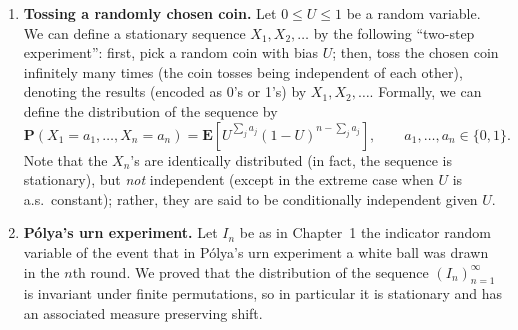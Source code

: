 \documentclass[12pt]{article}
\newcommand{\prob}{\mathbf{P}}
\newcommand{\expec}{\mathbf{E}}
\theoremstyle{example}
\begin{document}
\begin{enumerate}[1.]
$$ p_{i,j} = \prob(X_{2} = \alpha_j\,|\,X_1=\alpha_i), \qquad (1\le i,j\le d), $$
then the matrix $P = (p_{i,j})_{i,j=1}^d$ together with the probability distribution of the initial state $X_0$ determine the distribution of the entire sequence. The probability $p_{i,j}$ is referred to as the \textbf{transition probability from state $i$ to $j$}, and the matrix $P$ is called the \textbf{transition matrix} of the chain. The distribution of $X_0$ is usually given as a probability vector $\pi=(\pi_1,\ldots,\pi_d)$ where $\pi_j=\prob(X_0=j)$. It is easy to show (we will do so later, when we study Markov chains more in depth) that the vector $\pi^{(n)} = (\pi_1^{(n)},\ldots,\pi_d^{(n)})$ representing the probability distribution of $X_n$ is obtained from $\pi$ and $P$ via
$$ \pi^{(n)} = \pi P^n, $$
the linear-algebraic result of multiplying the row vector $\pi$ by the matrix $P$ multiplied by itself $n$ times.

Assume now that $\pi$ is chosen to be a probability vector satisfying the equation $\pi=\pi P$; i.e., $\pi$ is a left-eigenvector of the transition matrix $P$ with eigenvalue $1$. By the above remarks, this means that the sequence $(X_n)_n$ is a sequence of identically distributed random variables, and furthermore it is easy to see that $(X_n)_n$ is in fact a stationary sequence. A Markov chain started with such an initial state distribution is called a \textbf{stationary Markov chain}. The associated shift measure preserving system is known as a \textbf{Markov shift}.

\item \textbf{Tossing a randomly chosen coin.} Let $0\le U\le 1$ be a random variable. We can define a stationary sequence $X_1,X_2,\ldots$ by the following ``two-step experiment'': first, pick a random coin with bias $U$; then, toss the chosen coin infinitely many times (the coin tosses being independent of each other), denoting the results (encoded as 0's or 1's) by $X_1,X_2,\ldots$. Formally, we can define the distribution of the sequence by
$$ 
\prob(X_1=a_1,\ldots,X_n=a_n) = \expec\left[U^{\sum_j a_j} (1-U)^{n-\sum_j a_j}\right], \qquad a_1,\ldots,a_n\in\{0,1\}.
$$
Note that the $X_n$'s are identically distributed (in fact, the sequence is stationary), but \emph{not} independent (except in the extreme case when $U$ is a.s.\ constant); rather, they are said to be conditionally independent given $U$.

\item \textbf{P\'olya's urn experiment.} Let $I_n$ be as in Chapter~1 the indicator random variable of the event that in P\'olya's urn experiment a white ball was drawn in the $n$th round. We proved that the distribution of the sequence $(I_n)_{n=1}^\infty$ is invariant under finite permutations, so in particular it is stationary and has an associated measure preserving shift.


\end{enumerate}
\end{document}
